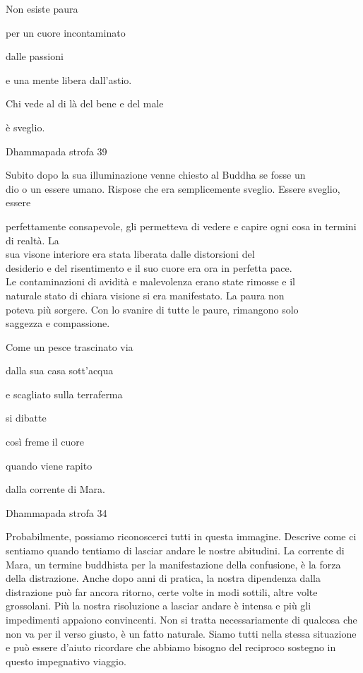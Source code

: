 \documentclass[a4paper,portrait,12pt]{article}
\begin{document}
\newpage



Non esiste paura


per un cuore incontaminato


dalle passioni


e una mente libera dall'astio. 


Chi vede al di l\`{a} del bene e del male


\`{e} sveglio. 





Dhammapada strofa 39


\newpage



Subito dopo la sua illuminazione venne chiesto al Buddha se fosse un\\dio o un essere umano. Rispose che era semplicemente sveglio. Essere sveglio, essere 


perfettamente consapevole, gli permetteva di vedere e capire ogni cosa in termini di realt\`{a}. La\\sua visone interiore era stata liberata dalle distorsioni del\\desiderio e del risentimento e il suo cuore era ora in perfetta pace.\\Le contaminazioni di avidit\`{a} e malevolenza erano state rimosse e il\\naturale stato di chiara visione si era manifestato. La paura non\\poteva più sorgere. Con lo svanire di tutte le paure, rimangono solo\\saggezza e compassione.\\


\newpage



Come un pesce trascinato via


dalla sua casa sott'acqua	


e scagliato sulla terraferma


si dibatte


così freme il cuore


quando viene rapito


dalla corrente di Mara. 





Dhammapada strofa 34


\newpage



Probabilmente, possiamo riconoscerci tutti in questa immagine. Descrive come ci sentiamo quando tentiamo di lasciar andare le nostre abitudini. La corrente di Mara, un termine buddhista per la manifestazione della confusione, \`{e} la forza della distrazione. Anche dopo anni di pratica, la nostra dipendenza dalla distrazione pu\`{o} far ancora ritorno, certe volte in modi sottili, altre volte grossolani. Più la nostra risoluzione a lasciar andare \`{e} intensa e più gli impedimenti appaiono convincenti. Non si tratta necessariamente di qualcosa che non va per il verso giusto, \`{e} un fatto naturale. Siamo tutti nella stessa situazione e pu\`{o} essere d'aiuto ricordare che abbiamo bisogno del reciproco sostegno in questo impegnativo viaggio.
\end{document}
